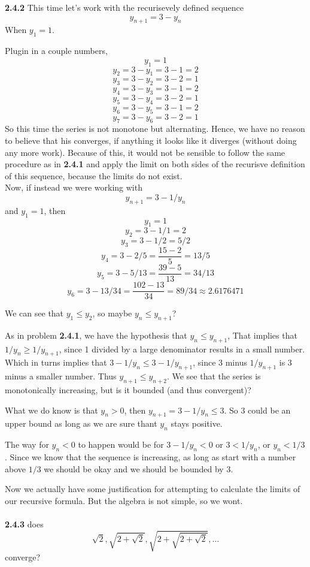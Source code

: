 \textbf{2.4.2}
This time let's work with the recurisevely defined sequence
$$
y_{n+1} = 3 - y_n
$$
When $y_1 = 1$.

Plugin in a couple numbers,
$$
y_1 = 1
$$
$$
y_2 = 3 - y_1 = 3-1 = 2
$$
$$
y_3 = 3 - y_2 = 3 - 2 = 1
$$
$$
y_4 = 3 - y_3 = 3 - 1 = 2
$$
$$
y_5 = 3 - y_4 = 3 - 2 = 1
$$
$$
y_6 = 3 - y_5 = 3 - 1 = 2
$$
$$
y_7 = 3 - y_6 = 3 - 2 = 1
$$
So this time the series is not monotone but alternating.
Hence, we have no reason to believe that his converges, if anything it looks like it diverges (without doing any more work).
Because of this, it would not be sensible to follow the same procedure as in \textbf{2.4.1}
and apply the limit on both sides of the recurisve definition of this sequence, because
the limits do not exist.
\\

Now, if instead we were working with
$$
y_{n+1} = 3 - 1/y_n
$$
and $y_1 = 1$, then
$$
y_1 = 1
$$
$$
y_2 = 3 - 1/1 = 2
$$
$$
y_3 = 3 - 1/2 = 5/2
$$
$$
y_4 = 3 - 2/5 = \frac{15 - 2}{5} = 13/5
$$
$$
y_5 = 3 - 5/13 = \frac{39 - 5}{13} = 34/13
$$
$$
y_6 = 3 - 13/34 = \frac{102 - 13}{34} = 89/34 \approx 2.6176471
$$

We can see that $y_1 \leq y_2$, so maybe $y_n \leq y_{n+1}$?

As in problem \textbf{2.4.1}, we have the hypothesis that $y_n \leq y_{n+1}$,
That implies that $1/y_n \geq 1/y_{n+1}$, since 1 divided by a large denominator results in a small number.
Which in turns implies that $3 - 1/y_n \leq 3 - 1/y_{n+1}$, since 3 minus $1/y_{n+1}$ is 3 minus a smaller number.
Thus $y_{n+1} \leq y_{n+2}$.
We see that the series is monotonically increasing, but is it bounded (and thus convergent)?

What we do know is that $y_n > 0$, then $y_{n+1} = 3 - 1/y_n \leq 3$.
So 3 could be an upper bound as long as we are sure thant $y_n$ stays positive.

The way for $y_n < 0$ to happen would be for $3 - 1/y_n < 0$ or $3 < 1/y_n$, or $y_n < 1/3$.
Since we know that the sequence is increasing, as long as start with a number above $1/3$ we should be okay
and we should be bounded by 3.

Now we actually have some justification for attempting to calculate the limits of our
recursive formula.
But the algebra is not simple, so we wont.
\\~\\



\textbf{2.4.3}
does
$$
\sqrt{2}, \sqrt{2 + \sqrt{2}}, \sqrt{2 + \sqrt{2 + \sqrt{2}}}, \ldots
$$
converge?

